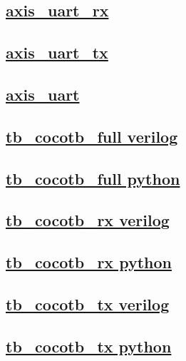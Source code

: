 \documentclass{article}
\begin{document}
  


  \subsection{\href{../files/axis_uart_rx-v.html}{axis\_uart\_rx}}

  \subsection{\href{../files/axis_uart_tx-v.html}{axis\_uart\_tx}}

  \subsection{\href{../files/axis_uart-v.html}{axis\_uart}}

  \subsection{\href{../files2/tb_cocotb_full-v.html}{tb\_cocotb\_full verilog}}

  \subsection{\href{../files2/tb_cocotb_full-py.html}{tb\_cocotb\_full python}}

  \subsection{\href{../files2/tb_cocotb_rx-v.html}{tb\_cocotb\_rx verilog}}

  \subsection{\href{../files2/tb_cocotb_rx-py.html}{tb\_cocotb\_rx python}}

  \subsection{\href{../files2/tb_cocotb_tx-v.html}{tb\_cocotb\_tx verilog}}

  \subsection{\href{../files2/tb_cocotb_tx-py.html}{tb\_cocotb\_tx python}}
\end{document}
